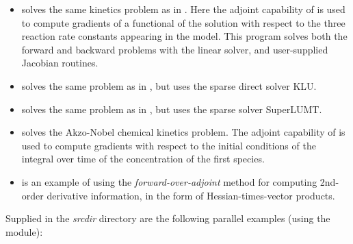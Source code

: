 \begin{itemize}
\item {}
  solves the same kinetics problem as in .
  \newline
  Here the adjoint capability of {\idas} is used to compute gradients
  of a functional of the solution with respect to the three
  reaction rate constants appearing in the model.
  This program solves both the forward and backward problems with the 
  {\sunlinsoldense} linear solver, and user-supplied Jacobian routines.

\item {}
  solves the same problem as in , but
  uses the sparse direct solver KLU.

\item {}
  solves the same problem as in , but
  uses the sparse solver SuperLUMT.

\item {}
  solves the Akzo-Nobel chemical kinetics problem.
  \newline
  The adjoint capability of {\idas} is used to compute gradients with
  respect to the initial conditions of the integral over time of the 
  concentration of the first species.


\item {}
  is an example of using the {\em forward-over-adjoint} method for
  computing 2nd-order derivative information, in the form of Hessian-times-vector
  products.

\end{itemize}


\vspace{0.2in}\noindent 
Supplied in the {\em srcdir} directory are
the following parallel examples (using the {\nvecp} module):

